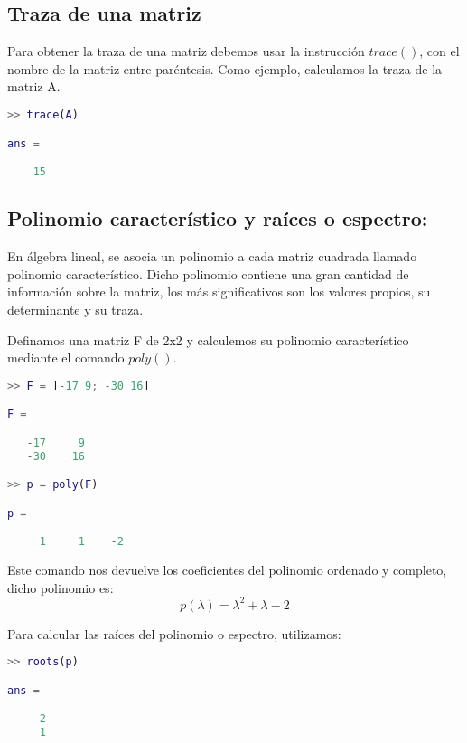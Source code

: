 \subsection{Traza de una matriz}

Para obtener la traza de una matriz debemos usar la instrucción $trace()$, con el nombre de la matriz entre paréntesis. Como ejemplo, calculamos la traza de la matriz A.
\begin{lstlisting}[language=Matlab]
>> trace(A)

ans =

    15

\end{lstlisting}


\subsection{Polinomio característico y raíces o espectro:}
En álgebra lineal, se asocia un polinomio a cada matriz cuadrada llamado polinomio característico. Dicho polinomio contiene una gran cantidad de información sobre la matriz, los más significativos son los valores propios, su determinante y su traza.


Definamos una matriz F de 2x2 y calculemos su polinomio característico mediante el comando $poly()$.
\begin{lstlisting}[language=Matlab]
>> F = [-17 9; -30 16]

F =

   -17     9
   -30    16

>> p = poly(F)

p =

     1     1    -2

\end{lstlisting}
Este comando nos devuelve los coeficientes del polinomio ordenado y completo, dicho polinomio es: $$p(\lambda) = \lambda^{2} + \lambda - 2$$

Para calcular las raíces del polinomio o espectro, utilizamos:
\begin{lstlisting}[language=Matlab]
>> roots(p)

ans =

    -2
     1
\end{lstlisting}


